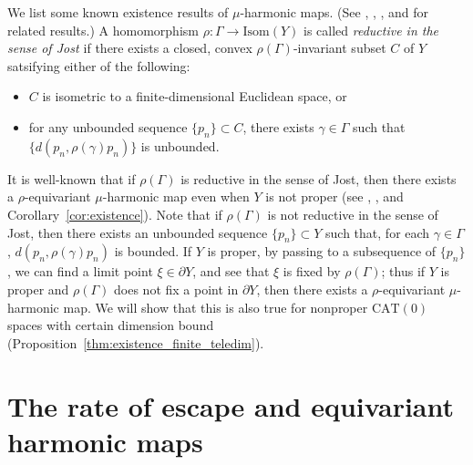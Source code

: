 \documentclass[12pt]{amsart}
\numberwithin{equation}{section}
\theoremstyle{plain}
\theoremstyle{definition}
\theoremstyle{remark}
\newcommand{\isom}[1]{\mathrm{Isom}({#1})}
\newcommand{\cat}[1]{\mathrm{CAT}(#1)}
\begin{document}
We list some known existence results of $\mu$-harmonic maps. 
(See \cite{gromov}, \cite{korevaar-schoen2}, 
\cite{jost}, and \cite{labourie} for related results.)
A homomorphism $\rho\colon \Gamma\rightarrow \isom{Y}$ is called 
{\it reductive in the sense of Jost \cite{jost}} if there exists
a closed, convex $\rho(\Gamma)$-invariant subset $C$ of $Y$ satsifying
either of the following:
\begin{itemize}
 \item $C$ is isometric to a finite-dimensional Euclidean space, or
 \item for any unbounded sequence $\{p_n\}\subset C$, there exists
       $\gamma \in \Gamma$ such that $\{d(p_n, \rho(\gamma)p_n)\}$ is
       unbounded. 
\end{itemize}
\noindent
It is well-known that if $\rho(\Gamma)$ is 
reductive in the sense of Jost, then there exists a
$\rho$-equivariant $\mu$-harmonic map even when $Y$ is not proper (see
\cite{jost}, \cite{labourie}, and Corollary~\ref{cor:existence}). 
Note that if $\rho(\Gamma)$ is not
reductive in the sense of Jost, then there exists an unbounded
sequence $\{p_n\} \subset Y$ such that, for each $\gamma \in \Gamma$, 
$d(p_n,\rho(\gamma)p_n)$ is bounded. 
If $Y$ is proper, by passing to a subsequence of $\{p_n\}$, we can find
a limit point $\xi \in \partial Y$, and see that $\xi$ is fixed by
$\rho(\Gamma)$; thus if $Y$ is proper and $\rho(\Gamma)$ does not fix a
point in $\partial Y$, then there exists a $\rho$-equivariant
$\mu$-harmonic map. 
We will show that this is also true for nonproper $\cat{0}$ spaces with
certain dimension bound
(Proposition~\ref{thm:existence_finite_teledim}).  



\section{The rate of escape and equivariant harmonic maps}
\label{sec:rate_of_escape_and_hmap}
\end{document}
